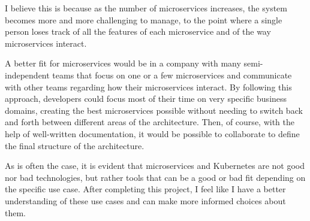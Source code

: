 \documentclass[manuscript,screen,review]{acmart}
\begin{document}
I believe this is because as the number of microservices increases, the system becomes more and more challenging to manage, to the point where a single person loses track of all the features of each microservice and of the way microservices interact.

A better fit for microservices would be in a company with many semi-independent teams that focus on one or a few microservices and communicate with other teams regarding how their microservices interact. By following this approach, developers could focus most of their time on very specific business domains, creating the best microservices possible without needing to switch back and forth between different areas of the architecture. Then, of course, with the help of well-written documentation, it would be possible to collaborate to define the final structure of the architecture.

As is often the case, it is evident that microservices and Kubernetes are not good nor bad technologies, but rather tools that can be a good or bad fit depending on the specific use case. After completing this project, I feel like I have a better understanding of these use cases and can make more informed choices about them.
\end{document}
